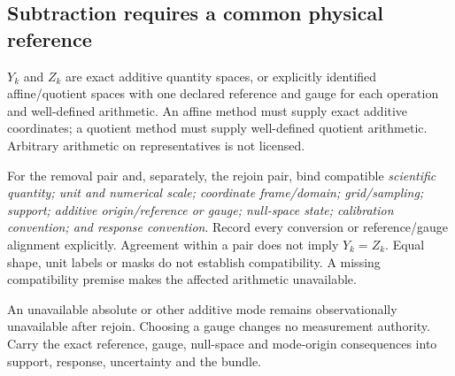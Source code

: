 {{\subsection*{Subtraction requires a common physical reference}
$Y_k$ and $Z_k$ are exact additive quantity spaces, or explicitly identified
affine/quotient spaces with one declared reference and gauge for each
operation and well-defined arithmetic. An affine method must supply exact
additive coordinates; a quotient method must supply well-defined quotient
arithmetic. Arbitrary arithmetic on representatives is not licensed.

For the removal pair and, separately, the rejoin pair, bind compatible
\emph{scientific quantity; unit and numerical scale; coordinate frame/domain;
grid/sampling; support; additive origin/reference or gauge; null-space state;
calibration convention; and response convention}. Record every conversion or
reference/gauge alignment explicitly. Agreement within a pair does not imply
$Y_k=Z_k$. Equal shape, unit labels or masks do not establish compatibility.
A missing compatibility premise makes the affected arithmetic unavailable.

An unavailable absolute or other additive mode remains observationally
unavailable after rejoin. Choosing a gauge changes no measurement authority.
Carry the exact reference, gauge, null-space and mode-origin consequences into
support, response, uncertainty and the bundle.
}}
